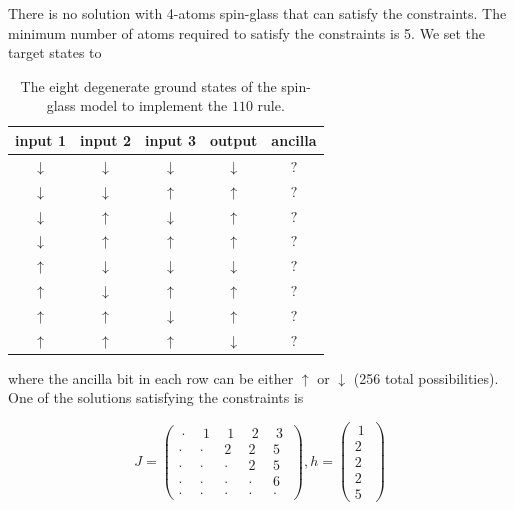 \documentclass[twocolumn,superscriptaddress,english,showpacs,longbibliography]{revtex4-2}
\begin{document}
There is no solution with 4-atoms spin-glass that can satisfy the
constraints. The minimum number of atoms required to satisfy the
constraints is 5. We set the target states to

\begin{table}[H]
    \centering
\begin{tabular}{|c|c|c|c|c|}
\hline
input 1 & input 2 & input 3 & output & ancilla \\
\hline
$\downarrow$ & $\downarrow$ & $\downarrow$ & $\downarrow$ & $?$ \\
$\downarrow$ & $\downarrow$ & $\uparrow$ & $\uparrow$ & $?$ \\
$\downarrow$ & $\uparrow$ & $\downarrow$ & $\uparrow$ & $?$ \\
$\downarrow$ & $\uparrow$ & $\uparrow$ & $\uparrow$ & $?$ \\
$\uparrow$ & $\downarrow$ & $\downarrow$ & $\downarrow$ & $?$ \\
$\uparrow$ & $\downarrow$ & $\uparrow$ & $\uparrow$ & $?$ \\
$\uparrow$ & $\uparrow$ & $\downarrow$ & $\uparrow$ & $?$ \\
$\uparrow$ & $\uparrow$ & $\uparrow$ & $\downarrow$ & $?$ \\
\hline
\end{tabular}
\caption{The eight degenerate ground states of the spin-glass model to implement the $110$ rule.}
\end{table}

where the ancilla bit in each row can be either $\uparrow$ or
$\downarrow$ (256 total possibilities). One of the solutions
satisfying the constraints is

\begin{equation}
J = \begin{pmatrix}
~\cdot~ & ~1~ & ~1~ & ~2~ & ~3~\\
\cdot & \cdot & 2 & 2 & 5\\
\cdot & \cdot & \cdot & 2 & 5\\
\cdot & \cdot & \cdot & \cdot & 6\\
\cdot & \cdot & \cdot & \cdot & \cdot
\end{pmatrix}, h = \begin{pmatrix}
~1~\\
2\\
2\\
2\\
5
\end{pmatrix}
\end{equation}
\end{document}
